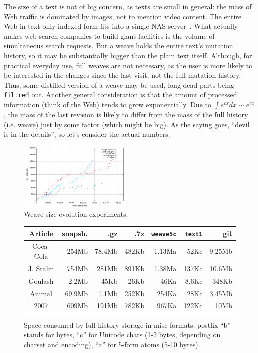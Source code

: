 \documentclass{sig-alternate}
\begin{document}
The size of a text is not of big concern, as texts are small in general: the mass of Web traffic is dominated by images, not to mention video content.
The entire Web in text-only indexed form fits into a single NAS server~\cite{own-experience}. What actually makes web search companies to build giant facilities is the volume of simultaneous search requests.
But a weave holds the entire text's mutation history, so it may be substantially bigger than the plain text itself.
Although, for practical everyday use, full weaves are not necessary, as the user is more likely to be interested in the changes since the last visit, not the full mutation history.
Thus, some distilled version of a weave may be used, long-dead parts being {\tt filtre}d out.
Another general consideration is that the amount of processed information (think of the Web) tends to grow exponentially. Due to $\int e^{cx}dx \sim e^{cx}$, the mass of the last revision is likely to differ from the mass of the full history (i.e. weave) just by some factor (which might be big).
As the saying goes, ``devil is in the details'', so let's consider the actual numbers.

\begin{figure} 
\includegraphics[width=0.48\textwidth]{weave-growth.pdf}
\caption{Weave size evolution experiments.} \label{fig:weave}
\end{figure}
\begin{figure} 
\resizebox{0.48\textwidth}{!} {
\begin{tabular}{|c|r|r|r|r|r|r|}
\hline
Article & snapsh. & .gz & .7z & {\tt weave5c} & {\tt text1} & git \\
\hline
Coca-Cola& 254Mb &78.4Mb & 482Kb & 1.13Ma & 52Kc & 9.25Mb\\
J. Stalin&754Mb& 281Mb&891Kb& 1.38Ma&137Kc& 10.6Mb\\
Goulash&2.2Mb&45Kb&26Kb&46Ka&8.6Kc& 348Kb\\
Animal & 69.9Mb & 1.1Mb & 252Kb & 254Ka & 28Kc & 3.45Mb\\
2007 & 609Mb & 191Mb & 782Kb & 967Ka & 122Kc & 10Mb\\
\hline
\end{tabular}
}
\caption{Space consumed by full-history storage in misc formats; postfix ``b'' stands for bytes, ``c'' for Unicode chars (1-2 bytes, depending on charset and encoding), ``a'' for 5-form atoms (5-10 bytes).} \label{fig:sizes} %
\end{figure}
\end{document}
